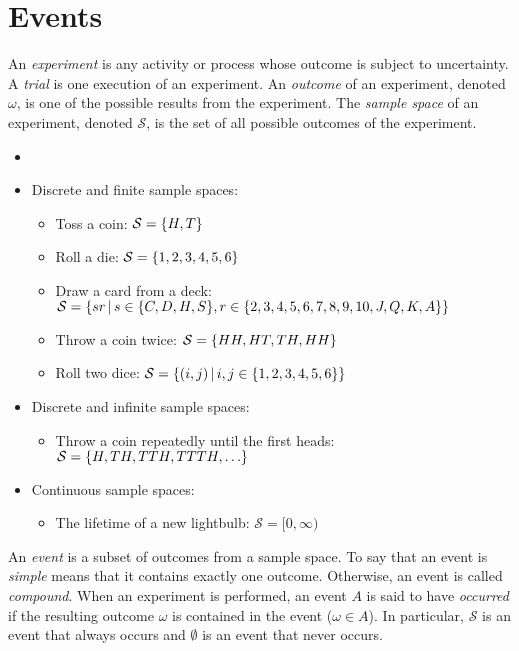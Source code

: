 \documentclass[letterpaper,12pt,fleqn]{article}
\newcommand{\w}{\omega}
\renewcommand{\S}{\mathcal{S}}
\begin{document}
\section*{Events}

\begin{definition}[Experiment]
  An \emph{experiment} is any activity or process whose outcome is subject to uncertainty.  A \emph{trial} is one execution of
  an experiment.  An \emph{outcome} of an experiment, denoted \(\w\), is one of the possible results from the experiment.  The
  \emph{sample space} of an experiment, denoted \(\S\), is the set of all possible outcomes of the experiment.
\end{definition}

\begin{examples}
  \begin{itemize}
  \item[]
  \item Discrete and finite sample spaces:
    \begin{itemize}
    \item Toss a coin: \(\S=\set{H,T}\)
    \item Roll a die: \(\S=\set{1,2,3,4,5,6}\)
    \item Draw a card from a deck: \(\S=\setb{sr}{s\in\set{C,D,H,S},r\in\set{2,3,4,5,6,7,8,9,10,J,Q,K,A}}\)
    \item Throw a coin twice: \(\S=\set{HH,HT,TH,HH}\)
    \item Roll two dice: \(\S=\setb{(i,j)}{i,j\in\set{1,2,3,4,5,6}}\)
    \end{itemize}

  \item Discrete and infinite sample spaces:
    \begin{itemize}
    \item Throw a coin repeatedly until the first heads: \(\S=\set{H,TH,TTH,TTTH,\ldots}\)
    \end{itemize}
  
  \item Continuous sample spaces:
    \begin{itemize}
    \item The lifetime of a new lightbulb: \(\S=[0,\infty)\)
    \end{itemize}
  \end{itemize}
\end{examples}

\begin{definition}[Event]
  An \emph{event} is a subset of outcomes from a sample space.  To say that an event is \emph{simple} means that it contains
  exactly one outcome.  Otherwise, an event is called \emph{compound}.  When an experiment is performed, an event \(A\) is
  said to have \emph{occurred} if the resulting outcome \(\w\) is contained in the event (\(\w\in A\)).  In particular,
  \(\S\) is an event that always occurs and \(\emptyset\) is an event that never occurs.
\end{definition}
\end{document}
